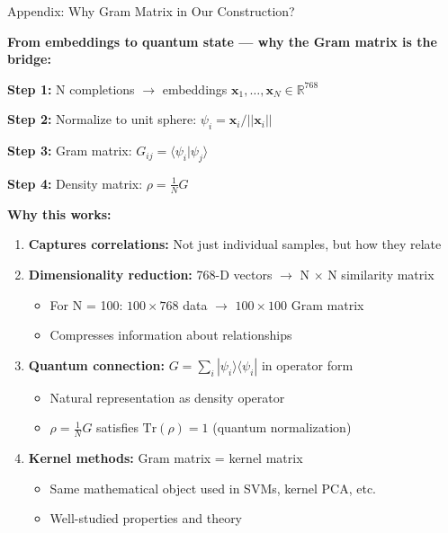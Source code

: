 \documentclass[aspectratio=169,11pt]{beamer}
\begin{document}
\begin{frame}{Appendix: Why Gram Matrix in Our Construction?}

\textbf{From embeddings to quantum state — why the Gram matrix is the bridge:}

\vspace{0.5em}

\textbf{Step 1:} N completions $\to$ embeddings $\mathbf{x}_1, \ldots, \mathbf{x}_N \in \mathbb{R}^{768}$

\textbf{Step 2:} Normalize to unit sphere: $\psi_i = \mathbf{x}_i / ||\mathbf{x}_i||$

\textbf{Step 3:} Gram matrix: $G_{ij} = \langle \psi_i | \psi_j \rangle$

\textbf{Step 4:} Density matrix: $\rho = \frac{1}{N} G$

\vspace{0.5em}

\textbf{Why this works:}

\begin{enumerate}
  \item \textbf{Captures correlations:} Not just individual samples, but how they relate
  \item \textbf{Dimensionality reduction:} 768-D vectors $\to$ N $\times$ N similarity matrix
  \begin{itemize}
    \item For N = 100: $100 \times 768$ data $\to$ $100 \times 100$ Gram matrix
    \item Compresses information about relationships
  \end{itemize}
  \item \textbf{Quantum connection:} $G = \sum_i |\psi_i\rangle\langle\psi_i|$ in operator form
  \begin{itemize}
    \item Natural representation as density operator
    \item $\rho = \frac{1}{N}G$ satisfies $\text{Tr}(\rho) = 1$ (quantum normalization)
  \end{itemize}
  \item \textbf{Kernel methods:} Gram matrix = kernel matrix
  \begin{itemize}
    \item Same mathematical object used in SVMs, kernel PCA, etc.
    \item Well-studied properties and theory
  \end{itemize}
\end{enumerate}

\end{frame}
\end{document}
